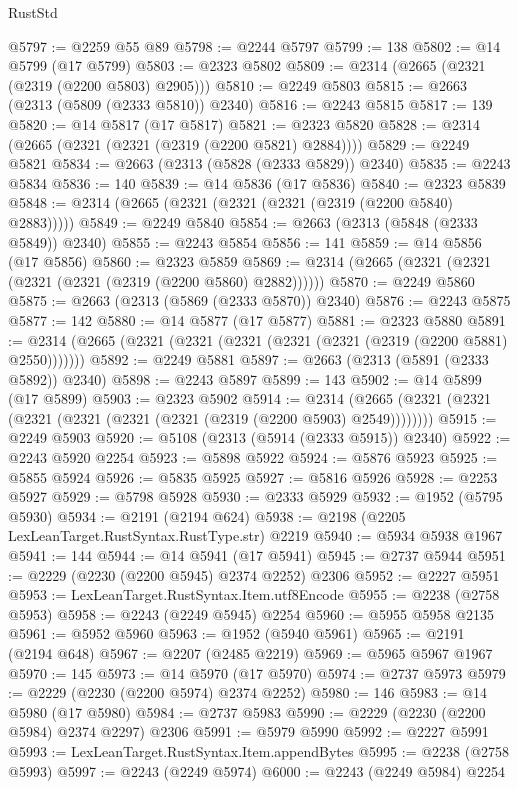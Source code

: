 \begin{lexlean}{RustStd}
\begin{coremodule}
{\begin{coremodule}
{{{{{{{{{{{{{{{{{{{{{{{{{{{{{{{{{{@5797 := @2259 @55 @89
@5798 := @2244 @5797
@5799 := 138
@5802 := @14 @5799 (@17 @5799)
@5803 := @2323 @5802
@5809 := @2314 (@2665 (@2321 (@2319 (@2200 @5803) @2905)))
@5810 := @2249 @5803
@5815 := @2663 (@2313 (@5809 (@2333 @5810)) @2340)
@5816 := @2243 @5815
@5817 := 139
@5820 := @14 @5817 (@17 @5817)
@5821 := @2323 @5820
@5828 := @2314 (@2665 (@2321 (@2321 (@2319 (@2200 @5821) @2884))))
@5829 := @2249 @5821
@5834 := @2663 (@2313 (@5828 (@2333 @5829)) @2340)
@5835 := @2243 @5834
@5836 := 140
@5839 := @14 @5836 (@17 @5836)
@5840 := @2323 @5839
@5848 := @2314 (@2665 (@2321 (@2321 (@2321 (@2319 (@2200 @5840) @2883)))))
@5849 := @2249 @5840
@5854 := @2663 (@2313 (@5848 (@2333 @5849)) @2340)
@5855 := @2243 @5854
@5856 := 141
@5859 := @14 @5856 (@17 @5856)
@5860 := @2323 @5859
@5869 := @2314 (@2665 (@2321 (@2321 (@2321 (@2321 (@2319 (@2200 @5860) @2882))))))
@5870 := @2249 @5860
@5875 := @2663 (@2313 (@5869 (@2333 @5870)) @2340)
@5876 := @2243 @5875
@5877 := 142
@5880 := @14 @5877 (@17 @5877)
@5881 := @2323 @5880
@5891 := @2314 (@2665 (@2321 (@2321 (@2321 (@2321 (@2321 (@2319 (@2200 @5881) @2550)))))))
@5892 := @2249 @5881
@5897 := @2663 (@2313 (@5891 (@2333 @5892)) @2340)
@5898 := @2243 @5897
@5899 := 143
@5902 := @14 @5899 (@17 @5899)
@5903 := @2323 @5902
@5914 := @2314 (@2665 (@2321 (@2321 (@2321 (@2321 (@2321 (@2321 (@2319 (@2200 @5903) @2549))))))))
@5915 := @2249 @5903
@5920 := @5108 (@2313 (@5914 (@2333 @5915)) @2340)
@5922 := @2243 @5920 @2254
@5923 := @5898 @5922
@5924 := @5876 @5923
@5925 := @5855 @5924
@5926 := @5835 @5925
@5927 := @5816 @5926
@5928 := @2253 @5927
@5929 := @5798 @5928
@5930 := @2333 @5929
@5932 := @1952 (@5795 @5930)
@5934 := @2191 (@2194 @624)
@5938 := @2198 (@2205 LexLeanTarget.RustSyntax.RustType.str) @2219
@5940 := @5934 @5938 @1967
@5941 := 144
@5944 := @14 @5941 (@17 @5941)
@5945 := @2737 @5944
@5951 := @2229 (@2230 (@2200 @5945) @2374 @2252) @2306
@5952 := @2227 @5951
@5953 := LexLeanTarget.RustSyntax.Item.utf8Encode
@5955 := @2238 (@2758 @5953)
@5958 := @2243 (@2249 @5945) @2254
@5960 := @5955 @5958 @2135
@5961 := @5952 @5960
@5963 := @1952 (@5940 @5961)
@5965 := @2191 (@2194 @648)
@5967 := @2207 (@2485 @2219)
@5969 := @5965 @5967 @1967
@5970 := 145
@5973 := @14 @5970 (@17 @5970)
@5974 := @2737 @5973
@5979 := @2229 (@2230 (@2200 @5974) @2374 @2252)
@5980 := 146
@5983 := @14 @5980 (@17 @5980)
@5984 := @2737 @5983
@5990 := @2229 (@2230 (@2200 @5984) @2374 @2297) @2306
@5991 := @5979 @5990
@5992 := @2227 @5991
@5993 := LexLeanTarget.RustSyntax.Item.appendBytes
@5995 := @2238 (@2758 @5993)
@5997 := @2243 (@2249 @5974)
@6000 := @2243 (@2249 @5984) @2254
}}}}}}}}}}}}}}}}}}}}}}}}}}}}}}}}}}
\end{coremodule}}
\end{coremodule}
\end{lexlean}
